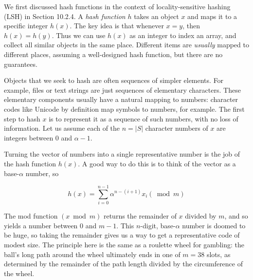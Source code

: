 \documentclass[10pt]{article}
\begin{document}
\begin{enumerate}
We first discussed hash functions in the context of locality-sensitive hashing (LSH) in Section 10.2.4. A \textit{hash function} $h$ takes an object $x$ and maps it to a specific integer $h(x)$. The key idea is that whenever $x = y$, then $h(x) = h(y)$. Thus we can use $h(x)$ as an integer to index an array, and collect all similar objects in the same place. Different items are \textit{usually} mapped to different places, assuming a well-designed hash function, but there are no guarantees.

Objects that we seek to hash are often sequences of simpler elements. For example, files or text strings are just sequences of elementary characters. These elementary components usually have a natural mapping to numbers: character codes like Unicode by definition map symbols to numbers, for example. The first step to hash $x$ is to represent it as a sequence of such numbers, with no loss of information. Let us assume each of the $n = |S|$ character numbers of $x$ are integers between 0 and $\alpha-1$.

Turning the vector of numbers into a single representative number is the job of the hash function $h(x)$. A good way to do this is to think of the vector as a base-$\alpha$ number, so

$$ h(x)=\sum_{i=0}^{n-1} \alpha^{n-(i+1)} x_{i}(\bmod m) $$

The mod function $(x \bmod m)$ returns the remainder of $x$ divided by $m$, and so yields a number between 0 and $m-1$. This $n$-digit, base-$\alpha$ number is doomed to be huge, so taking the remainder gives us a way to get a representative code of modest size. The principle here is the same as a roulette wheel for gambling: the ball's long path around the wheel ultimately ends in one of $m = 38$ slots, as determined by the remainder of the path length divided by the circumference of the wheel.


\end{enumerate}
\end{document}
